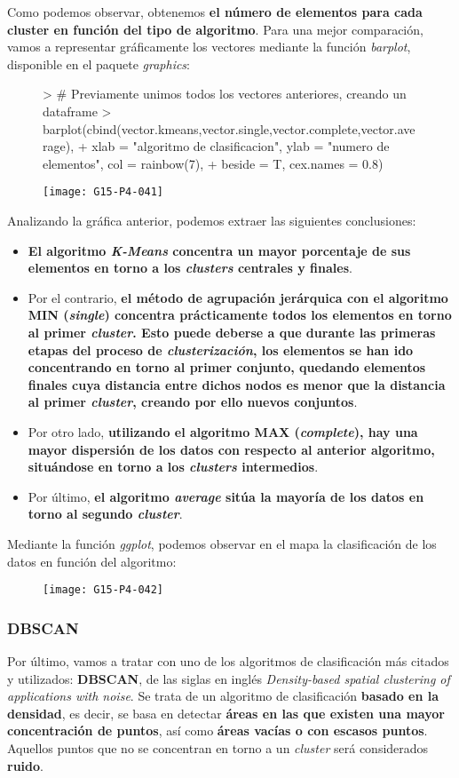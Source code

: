 \documentclass [a4paper] {article}
\begin{document}
Como podemos observar, obtenemos \textbf{el número de elementos para cada cluster en función del tipo de algoritmo}. Para una mejor comparación, vamos a representar gráficamente los vectores mediante la función \textit{barplot}, disponible en el paquete \textit{graphics}:
\begin{figure}[h!]
\centering
\begin{Schunk}
\begin{Sinput}
> # Previamente unimos todos los vectores anteriores, creando un dataframe
> barplot(cbind(vector.kmeans,vector.single,vector.complete,vector.average), 
+ xlab = "algoritmo de clasificacion", ylab = "numero de elementos", col = rainbow(7), 
+ beside = T, cex.names = 0.8)
\end{Sinput}
\end{Schunk}
\texttt{[image: G15-P4-041]}
\end{figure}

Analizando la gráfica anterior, podemos extraer las siguientes conclusiones:
\begin{itemize}
  \item \textbf{El algoritmo \textit{K-Means} concentra un mayor porcentaje de sus elementos en torno a los \textit{clusters} centrales y finales}.
  \item Por el contrario, \textbf{el método de agrupación jerárquica con el algoritmo MIN (\textit{single}) concentra prácticamente todos los elementos en torno al primer \textit{cluster}. Esto puede deberse a que durante las primeras etapas del proceso de \textit{clusterización}, los elementos se han ido concentrando en torno al primer conjunto, quedando elementos finales cuya distancia entre dichos nodos es menor que la distancia al primer \textit{cluster}, creando por ello nuevos conjuntos}.
  \item Por otro lado, \textbf{utilizando el algoritmo MAX (\textit{complete}), hay una mayor dispersión de los datos con respecto al anterior algoritmo, situándose en torno a los \textit{clusters} intermedios}.
  \item Por último, \textbf{el algoritmo \textit{average} sitúa la mayoría de los datos en torno al segundo \textit{cluster}}.
\end{itemize}
\newpage
Mediante la función \textit{ggplot}, podemos observar en el mapa la clasificación de los datos en función del algoritmo:
\begin{figure}[h!]
\centering
\texttt{[image: G15-P4-042]}
\end{figure}
\newpage
\subsubsection{DBSCAN}
Por último, vamos a tratar con uno de los algoritmos de clasificación más citados y utilizados: \textbf{DBSCAN}, de las siglas en inglés \textit{Density-based spatial clustering of applications with noise}. Se trata de un algoritmo de clasificación \textbf{basado en la densidad}, es decir, se basa en detectar \textbf{áreas en las que existen una mayor concentración de puntos}, así como \textbf{áreas vacías o con escasos puntos}. Aquellos puntos que no se concentran en torno a un \textit{cluster} será considerados \textbf{ruido}.
\end{document}
